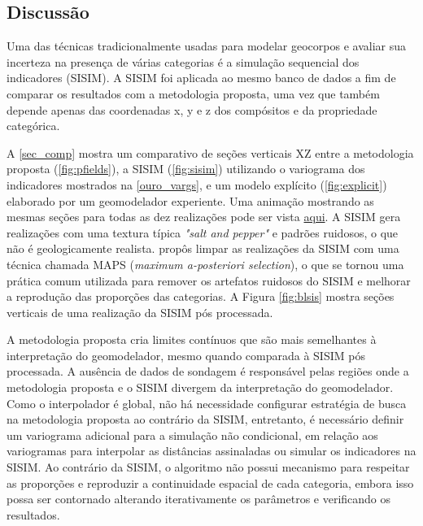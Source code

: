 \subsection{Discussão}

Uma das técnicas tradicionalmente usadas para modelar geocorpos e avaliar sua incerteza na presença de várias categorias é a simulação sequencial dos indicadores (SISIM). A SISIM foi aplicada ao mesmo banco de dados a fim de comparar os resultados com a metodologia proposta, uma vez que também depende apenas das coordenadas x, y e z dos compósitos e da propriedade categórica. 

A \autoref{sec_comp} mostra um comparativo de seções verticais XZ entre a metodologia proposta (\autoref{fig:pfields}), a SISIM (\autoref{fig:sisim}) utilizando o variograma dos indicadores mostrados na \autoref{ouro_vargs}, e um modelo explícito (\autoref{fig:explicit}) elaborado por um geomodelador experiente. Uma animação mostrando as mesmas seções para todas as dez realizações pode ser vista \href{https://github.com/robertorolo/assessing_geological_model_uncertainty_with_probability_fields/blob/main/ezgif-2-802d466feae1.gif}{aqui}. A SISIM gera realizações com uma textura típica \textit{"salt and pepper"} e padrões ruidosos, o que não é geologicamente realista.  propôs limpar as realizações da SISIM com uma técnica chamada MAPS (\textit{maximum a-posteriori selection}), o que se tornou uma prática comum utilizada para remover os artefatos ruidosos do SISIM e melhorar a reprodução das proporções das categorias. A Figura \autoref{fig:blsis} mostra seções verticais de uma realização da SISIM pós processada.

A metodologia proposta cria limites contínuos que são mais semelhantes à interpretação do geomodelador, mesmo quando comparada à SISIM pós processada. A ausência de dados de sondagem é responsável pelas regiões onde a metodologia proposta e o SISIM divergem da interpretação do geomodelador. Como o interpolador é global, não há necessidade configurar estratégia de busca na metodologia proposta ao contrário da SISIM, entretanto, é necessário definir um variograma adicional para a simulação não condicional, em relação aos variogramas para interpolar as distâncias assinaladas ou simular os indicadores na SISIM. Ao contrário da SISIM, o algoritmo não possui mecanismo para respeitar as proporções e reproduzir a continuidade espacial de cada categoria, embora isso possa ser contornado alterando iterativamente os parâmetros e verificando os resultados.

